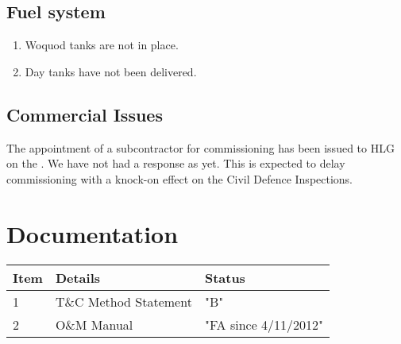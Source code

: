 \subsection{Fuel system}
\begin{enumerate}
\item Woquod tanks are not in place.
\item Day tanks have not been delivered.
\end{enumerate}
\subsection{Commercial Issues}

The appointment of a subcontractor for commissioning has been issued to HLG on the . We have not had a response as yet. This is expected to delay commissioning with a knock-on effect on the Civil Defence Inspections.

\section{Documentation}

\begin{tabular}{lll}
\toprule
Item & Details & Status\\
\midrule
1    & T\&C Method Statement & "B"\\
2    & O\&M Manual           & "FA since 4/11/2012" \\
\bottomrule
\end{tabular}

















